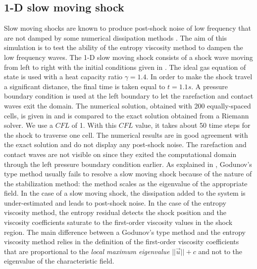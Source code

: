 \subsection{1-D slow moving shock} \label{sec:slow_moving_shock}

Slow moving shocks are known to produce post-shock noise of low frequency that are not damped by some numerical dissipation methods \cite{james}. The aim of this simulation is to test the ability of the entropy viscosity method to dampen the low frequency waves.
The 1-D slow moving shock consists of a shock wave moving from left to right with the initial conditions given in . The ideal gas equation of state is used with a heat capacity ratio $\gamma=1.4$.  In order to make the shock travel a significant distance, the final time is taken equal to $t=1.1s$. A pressure boundary condition is used at the left boundary to let the rarefaction and contact waves exit the domain.   
%
The numerical solution, obtained with 200 equally-spaced cells, is given in  and is compared to the exact solution obtained from a Riemann solver. We use a $CFL$ of 1. With this $CFL$ value, it takes about 50 time steps for the shock to traverse one cell.
%
The numerical results are in good agreement with the exact solution and do not display any post-shock noise. The rarefaction and contact waves are not visible on  since they exited the computational domain through the left pressure boundary condition earlier. As explained in \cite{roberts}, Godunov's type method usually fails to resolve a slow moving shock because of the nature of the stabilization method: the method scales as the eigenvalue of the appropriate field. In the case of a slow moving shock, the dissipation added to the system is under-estimated and leads to post-shock noise. In the case of the entropy viscosity method, the entropy residual detects the shock position and the viscosity coefficients saturate to the first-order viscosity values in the shock region. The main difference between a  Godunov's type method and the entropy viscosity method relies in the definition of the first-order viscosity coefficients that are proportional to the \emph{local maximum eigenvalue} $||\vec{u}||+c$ and not to the eigenvalue of the characteristic field.
%

